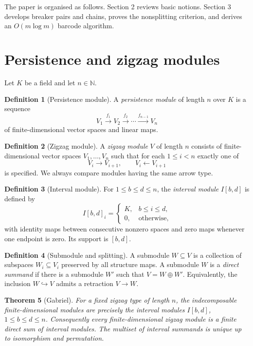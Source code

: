 \documentclass[11pt]{amsart}
\numberwithin{equation}{section}
\newtheorem{theorem}{Theorem}[section]
\theoremstyle{definition}
\newtheorem{definition}[theorem]{Definition}
\begin{document}
The paper is organised as follows. Section 2 reviews basic notions. Section 3 develops breaker pairs and chains, proves the nonsplitting criterion, and derives an $O(m\log m)$ barcode algorithm.



\section{Persistence and zigzag modules}\label{2}

Let $K$ be a field and let $n\in\mathbb N$.

\begin{definition}[Persistence module]
A \emph{persistence module} of length $n$ over $K$ is a sequence
\[
V_1\xrightarrow{f_1}V_2\xrightarrow{f_2}\cdots
\xrightarrow{f_{n-1}}V_n
\]
of finite-dimensional vector spaces and linear maps.
\end{definition}

\begin{definition}[Zigzag module]
A \emph{zigzag module} $V$ of length $n$ consists of finite-dimensional
vector spaces $V_1,\dots,V_n$ such that for each $1\le i<n$ exactly one of
\[
V_i\longrightarrow V_{i+1},
\qquad
V_i\longleftarrow V_{i+1}
\]
is specified.  We always compare modules having the same arrow type.
\end{definition}

\begin{definition}[Interval module]
For $1\le b\le d\le n$, the \emph{interval module} $I[b,d]$ is defined by
\[
I[b,d]_i=
\begin{cases}
K,& b\le i\le d,\\
0,& \text{otherwise},
\end{cases}
\]
with identity maps between consecutive nonzero spaces and zero maps whenever
one endpoint is zero.  Its support is $[b,d]$.
\end{definition}

\begin{definition}[Submodule and splitting]
A submodule $W\subseteq V$ is a collection of subspaces $W_i\subseteq V_i$
preserved by all structure maps.  A submodule $W$ is a \emph{direct
summand} if there is a submodule $W'$ such that $V=W\oplus W'$.  Equivalently,
the inclusion $W\hookrightarrow V$ admits a retraction $V\to W$.
\end{definition}

\begin{theorem}[Gabriel]\label{thm:gabriel}
For a fixed zigzag type of length $n$, the indecomposable finite-dimensional
modules are precisely the interval modules $I[b,d]$, $1\le b\le d\le n$.
Consequently every finite-dimensional zigzag module is a finite direct sum of
interval modules.  The multiset of interval summands is unique up to
isomorphism and permutation.
\end{theorem}
\end{document}
